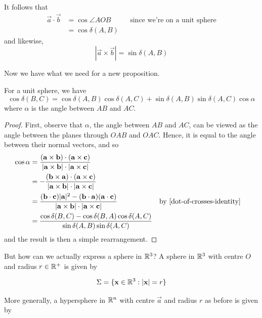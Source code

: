 \documentclass{../template/note}
\begin{document}
    It follows that
    \begin{align*}
        \vec a \cdot \vec b &= \cos \angle AOB && \text{since we're on a unit sphere} \\
        &= \cos \delta(A, B)
    \end{align*}
    and likewise,
    \[
        |\vec a \times \vec b| = \sin \delta(A, B)
    \]

    Now we have what we need for a new proposition.

    \begin{proposition}
        For a unit sphere, we have
        \[
            \cos \delta(B, C) = \cos \delta(A, B) \cos \delta(A, C) + \sin \delta(A, B) \sin \delta(A, C) \cos \alpha
        \]
        where \(\alpha\) is the angle between \(AB\) and \(AC\).
    \end{proposition}
    
    \begin{proof}
        First, observe that \(\alpha\), the angle between \(AB\) and \(AC\), can be viewed as the angle between the planes through \(OAB\) and \(OAC\). Hence, it is equal to the angle between their normal vectors, and so
        \begin{align*}
            \cos \alpha &= \frac{(\vec a \times \vec b) \cdot (\vec a \times \vec c)}{|\vec a \times \vec b| \cdot |\vec a \times \vec c|} \\
            &= -\frac{(\vec b \times \vec a) \cdot (\vec a \times \vec c)}{|\vec a \times \vec b| \cdot |\vec a \times \vec c|} \\
            &= \frac{(\vec b \cdot \vec c)|\vec a|^2 - (\vec b \cdot \vec a)(\vec a \cdot \vec c)}{|\vec a \times \vec b| \cdot |\vec a \times \vec c|} && \text{by \cref{dot-of-crosses-identity}} \\
            &= \frac{\cos \delta(B, C) - \cos \delta(B, A) \cos \delta(A, C)}{\sin \delta(A, B) \sin \delta(A, C)}
        \end{align*}
        and the result is then a simple rearrangement.
    \end{proof}
    
    But how can we actually express a sphere in \(\mathbb R^3\)? A sphere in \(\mathbb R^3\) with centre \(O\) and radius \(r \in \mathbb R^+\) is given by
    
    \[
        \Sigma = \{\vec x \in \RR^3: |\vec x| = r\}
    \]
    
    More generally, a hypersphere in \(\mathbb R^n\) with centre \(\vec a\) and radius \(r\) as before is given by
\end{document}
